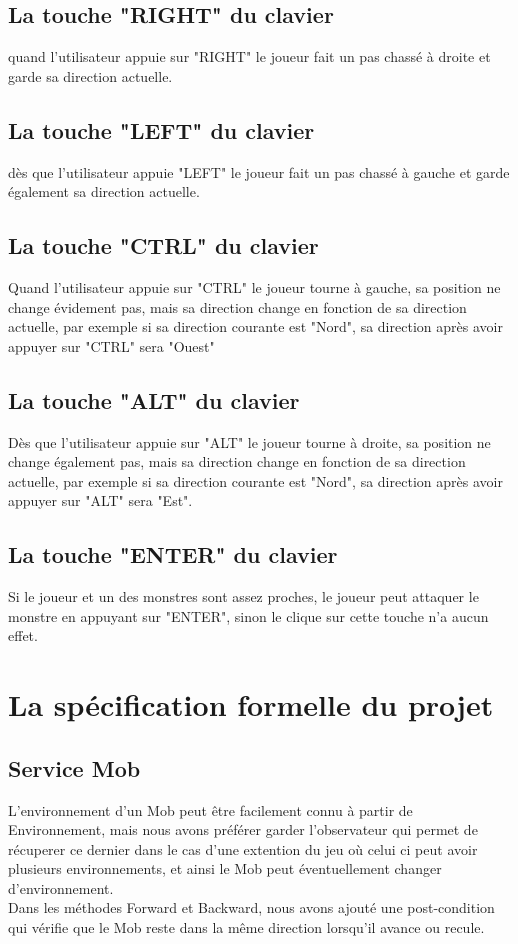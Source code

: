 \documentclass{article}
\begin{document}
\subsection{La touche "RIGHT" du clavier }quand l'utilisateur appuie sur "RIGHT" le joueur fait un pas chassé à droite et garde sa direction actuelle.

\subsection{La touche "LEFT" du clavier }dès que l'utilisateur appuie "LEFT" le joueur fait un pas chassé à gauche et garde également sa direction actuelle.
\subsection{La touche "CTRL" du clavier }
Quand l'utilisateur appuie sur "CTRL" le joueur tourne à gauche, sa position ne change évidement pas, mais sa direction change en fonction de sa direction actuelle, par exemple si sa direction courante est "Nord", sa direction après avoir appuyer sur "CTRL" sera "Ouest"

\subsection{La touche "ALT" du clavier }Dès que  l'utilisateur appuie sur "ALT" le joueur tourne à droite, sa position ne change également pas, mais sa direction change en fonction de sa direction actuelle, par exemple si sa direction courante est "Nord", sa direction après avoir appuyer sur "ALT" sera "Est".
\subsection{La touche "ENTER" du clavier} Si le joueur et un des monstres sont assez proches, le joueur peut attaquer le monstre en appuyant sur "ENTER", sinon le clique sur cette touche n'a aucun effet.



\section{La spécification formelle du projet}

\subsection{Service Mob }
L'environnement d'un Mob peut être facilement connu à partir de Environnement, mais nous avons préférer garder l'observateur qui permet de récuperer ce dernier dans le cas d'une extention du jeu où celui ci peut avoir plusieurs environnements, et ainsi le Mob peut éventuellement changer d'environnement.
\\
Dans les méthodes Forward et Backward, nous avons ajouté une post-condition qui vérifie que le Mob reste dans la même direction lorsqu'il avance ou recule.
\end{document}
